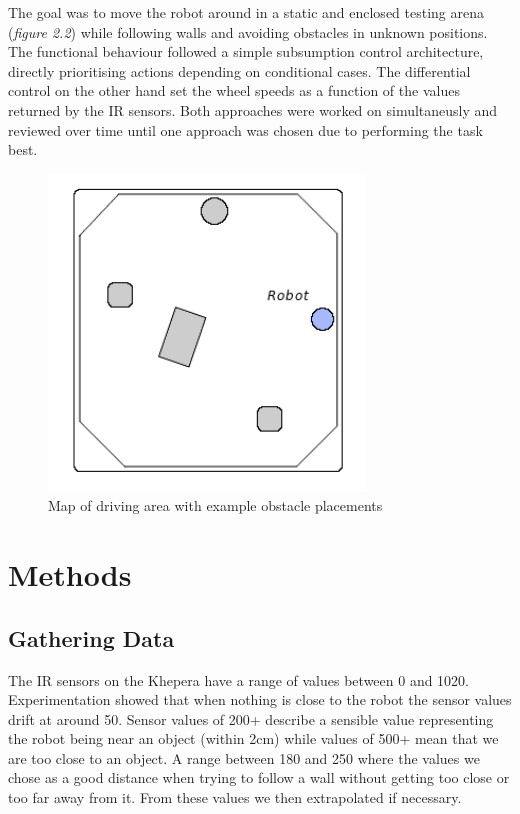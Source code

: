 \documentclass[paper=a4, fontsize=12pt]{scrartcl}	%
\numberwithin{equation}{section}		%
\numberwithin{figure}{section}			%
\numberwithin{table}{section}				%
\begin{document}
The goal was to move the robot around in a static and enclosed testing arena
(\emph{figure 2.2}) while following walls and avoiding obstacles in unknown
positions. The functional behaviour followed a simple subsumption control
architecture, directly prioritising actions depending on conditional cases. The
differential control on the other hand set the wheel speeds as a function of the
values returned by the IR sensors. Both approaches were worked on simultaneusly
and reviewed over time until one approach was chosen due to performing the task
best.
\begin{figure}[!ht]
 \centering
  \includegraphics[width=0.75\textwidth]{mapexample}
  \caption{Map of driving area with example obstacle placements}
\end{figure}

\section{Methods}
\subsection{Gathering Data}
The IR sensors on the Khepera have a range of values between 0 and 1020.
Experimentation showed that when nothing is close to the robot the sensor values
drift at around 50. Sensor values of 200+ describe a sensible value representing
the robot being near an object (within 2cm) while values of 500+ mean that we
are too close to an object. A range between 180 and 250 where the values we
chose as a good distance when trying to follow a wall without getting too close
or too far away from it. From these values we then extrapolated if necessary.
\end{document}

